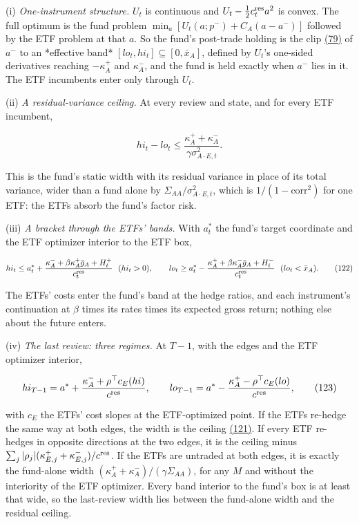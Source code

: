 \documentclass[11pt]{article}
\begin{document}
(i) \emph{One-instrument structure.} \(U_t\) is continuous and
\(U_t-\frac12c^{\rm res}_ta^2\) is convex. The full optimum is the fund problem
\(\min_a[U_t(a;p^-)+C_A(a-a^-)]\) followed by the ETF problem at that \(a\). So
the fund's post-trade holding is the clip \hyperref[eq:79]{(79)} of \(a^-\) to an *effective
band* \([lo_t,hi_t]\subseteq[0,\bar x_A]\), defined by \(U_t\)'s one-sided derivatives
reaching \(-\kappa^+_A\) and \(\kappa^-_A\), and the fund is held exactly when \(a^-\)
lies in it. The ETF incumbents enter only through \(U_t\).

(ii) \emph{A residual-variance ceiling.} At every review and state, and for
every ETF incumbent,

\begin{equation*}
hi_t-lo_t\leq\frac{\kappa^+_A+\kappa^-_A}{\gamma\sigma^2_{A\cdot E,t}}.\tag{121}\label{eq:121}
\end{equation*}

This is the fund's static width with its residual variance in place of
its total variance, wider than a fund alone by
\(\Sigma_{AA}/\sigma^2_{A\cdot E,t}\), which is \(1/(1-\mathrm{corr}^2)\) for one ETF: the ETFs
absorb the fund's factor risk.

(iii) \emph{A bracket through the ETFs' bands.} With \(a^*_t\) the fund's
target coordinate and the ETF optimizer interior to the ETF box,

\begin{equation*}
hi_t\leq a^*_t+\frac{\kappa^-_A+\beta\kappa^+_A\bar g_A+H^+_t}{c^{\rm res}_t}\ \ (hi_t>0),\qquad
lo_t\geq a^*_t-\frac{\kappa^+_A+\beta\kappa^-_A\bar g_A+H^-_t}{c^{\rm res}_t}\ \ (lo_t<\bar x_A).\tag{122}\label{eq:122}
\end{equation*}

The ETFs' costs enter the fund's band at the hedge ratios, and each
instrument's continuation at \(\beta\) times its rates times its expected
gross return; nothing else about the future enters.

(iv) \emph{The last review: three regimes.} At \(T-1\), with the edges and the
ETF optimizer interior,

\begin{equation*}
hi_{T-1}=a^*+\frac{\kappa^-_A+\rho^\top c_E(hi)}{c^{\rm res}},\qquad
lo_{T-1}=a^*-\frac{\kappa^+_A-\rho^\top c_E(lo)}{c^{\rm res}},\tag{123}\label{eq:123}
\end{equation*}

with \(c_E\) the ETFs' cost slopes at the ETF-optimized point. If the
ETFs re-hedge the same way at both edges, the width is the ceiling
\hyperref[eq:121]{(121)}. If every ETF re-hedges in opposite directions at the two edges,
it is the ceiling minus \(\sum_j|\rho_j|(\kappa^+_{E,j}+\kappa^-_{E,j})/c^{\rm res}\). If the ETFs
are untraded at both edges, it is exactly the fund-alone width
\((\kappa^+_A+\kappa^-_A)/(\gamma\Sigma_{AA})\), for any \(M\) and without the interiority
of the ETF optimizer. Every band interior to the fund's box is at least
that wide, so the last-review width lies between the fund-alone width
and the residual ceiling.
\end{document}
